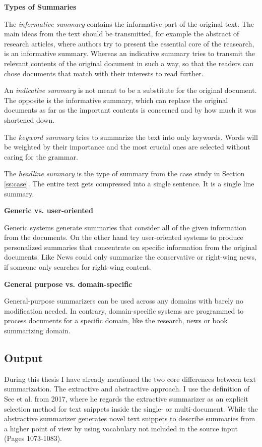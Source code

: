 \textbf{Types of Summaries}

The \textit{informative summary} contains the informative part of the original text. The main ideas from the text should be transmitted, for example the abstract of research articles, where authors try to present the essential core of the reasearch, is an informative summary. Whereas an indicative summary tries to transmit the relevant contents of the original document in such a way, so that the readers can chose documents that match with their interests to read further.

An \textit{indicative summary} is not meant to be a substitute for the original document. The opposite is the informative summary, which can replace the original documents as far as the important contents is concerned and by how much it was shortened down.

The \textit{keyword summary} tries to summarize the text into only keywords. Words will be weighted by their importance and the most crucial ones are selected without caring for the grammar.

The \textit{headline summary} is the type of summary from the case study in Section \ref{ss:case}. The entire text gets compressed into a single sentence. It is a single line summary.

\textbf{Generic vs. user-oriented}

Generic systems generate summaries that consider all of the given information from the documents. On the other hand try user-oriented systems to produce personalized summaries that concentrate on specific information from the original documents. Like News could only summarize the conservative or right-wing news, if someone only searches for right-wing content.

\textbf{General purpose vs. domain-specific}

General-purpose summarizers can be used across any domains with barely no modification needed. In contrary, domain-specific systems are programmed to process documents for a specific domain, like the research, news or book summarizing domain.

\subsection{Output}\label{ss:exabs}

During this thesis I have already mentioned the two core differences between text summarization. The extractive and abstractive approach. I use the definition of See et al. from 2017, where he regards the extractive summarizer as an explicit selection method for text snippets inside the single- or multi-document. While the abstractive summarizer generates novel text snippets to describe summaries from a higher point of view by using vocabulary not included in the source input \cite{see-etal-2017-get} (Pages 1073-1083). 

